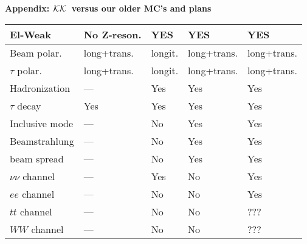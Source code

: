 \documentclass[dvips,portrait]{cernsem}             %
\newcommand{\KK}{${\cal KK}$}
\begin{document}
\begin{Slide}{{\bf\color{red} Appendix: \KK\ versus our older MC's and plans}}
{\begin{center}
\begin{tabular}{|p{17mm}|l|l|l|l|}
\hline%
El-Weak              & No Z-reson.   & YES   & YES   & YES  \\
\hline%
\hline%
{\tiny Beam polar.}  & {\tiny long+trans.}   
                     & longit.   & {\color{red} long+trans.}   & {\color{red} long+trans.}   \\
\hline%
$\tau$ polar.        & {\tiny long+trans.}   
                     & longit.   & {\color{red} long+trans.}   &  {\color{red} long+trans.}  \\
\hline%
\hline%
{\tiny Hadronization}   & ---   & Yes   & Yes               &  Yes   \\
\hline%
$\tau$ decay            & Yes   & Yes   &  Yes              &  Yes   \\
\hline%
{\tiny Inclusive mode}  & ---   & No    & Yes               &  Yes   \\
\hline%
{\tiny Beamstrahlung}   & ---   & No    & {\color{red} Yes} &  Yes   \\
\hline%
{\tiny beam spread}     & ---   & No    & Yes               &  Yes   \\
\hline%
\hline%
{\tiny $\nu\nu$ channel}& ---   & Yes   & {\color{red} No}  &  Yes   \\
\hline%
{\tiny $ee$ channel}    & ---   & No    & {\color{red} No}  &  Yes   \\
\hline%
{\tiny $tt$ channel}    & ---   & No    & No                &  ???   \\
\hline%
{\tiny $WW$ channel}    & ---   & No    & No                &  ???   \\
\hline\hline%
\end{tabular}
\end{center}
}

\end{Slide}                               %
\end{document}

